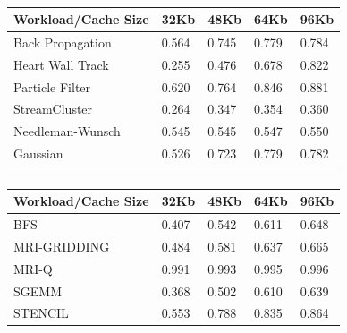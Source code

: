 \documentclass{thesis}
\begin{document}
\begin{center}
\begin{table}[h!]
\begin{latin}
\begin{tabular}{|p{}|p{}|p{}|p{}|p{}|}
\hline
Workload/Cache Size & 32Kb  & 48Kb  & 64Kb  & 96Kb \\
\hline
Back Propagation    & 0.564 & 0.745 & 0.779 & 0.784 \\
\hline
Heart Wall Track    & 0.255 & 0.476 & 0.678 & 0.822 \\
\hline
Particle Filter     & 0.620 & 0.764 & 0.846 & 0.881 \\
\hline
StreamCluster       & 0.264 & 0.347 & 0.354 & 0.360 \\
\hline
Needleman-Wunsch    & 0.545 & 0.545 & 0.547 & 0.550 \\
\hline
Gaussian            & 0.526 & 0.723 & 0.779 & 0.782 \\
\hline
\end{tabular}
\end{latin}
\caption{%
}
\label{table:rodiniahitrate}
\end{table}
\end{center}

\begin{center}
\begin{table}[h!]
\begin{latin}
\begin{tabular}{|p{}|p{}|p{}|p{}|p{}|}
\hline
Workload/Cache Size & 32Kb  & 48Kb  & 64Kb  & 96Kb \\
\hline
BFS                 & 0.407 & 0.542 & 0.611 & 0.648 \\
\hline
MRI-GRIDDING        & 0.484 & 0.581 & 0.637 & 0.665 \\
\hline
MRI-Q               & 0.991 & 0.993 & 0.995 & 0.996 \\
\hline
SGEMM               & 0.368 & 0.502 & 0.610 & 0.639 \\
\hline
STENCIL             & 0.553 & 0.788 & 0.835 & 0.864 \\
\hline
\end{tabular}
\end{latin}
\caption{%
}
\label{table:parboilhitrate}
\end{table}
\end{center}
\end{document}
